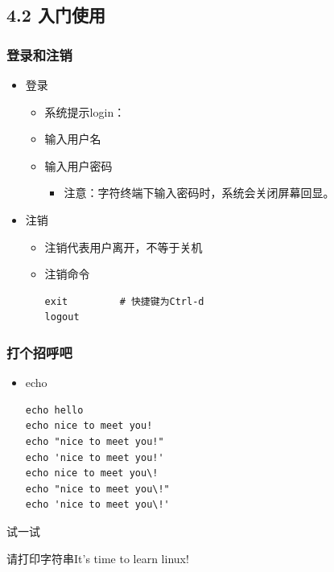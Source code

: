 \documentclass[xcolor=svgnames,bigger,presentation]{beamer}
\begin{document}
\subsection{4.2 入门使用}
\label{sec-4-2}
\begin{frame}[fragile]
\frametitle{登录和注销}
\label{sec-4-2-1}
\begin{itemize}

\item 登录
\label{sec-4-2-1-1}%
\begin{itemize}

\item 系统提示login：
\label{sec-4-2-1-1-1}%

\item 输入用户名
\label{sec-4-2-1-1-2}%

\item 输入用户密码
\label{sec-4-2-1-1-3}%
\begin{itemize}

\item 注意：字符终端下输入密码时，系统会关闭屏幕回显。
\label{sec-4-2-1-1-3-1}%
\end{itemize} %
\end{itemize} %

\item 注销
\label{sec-4-2-1-2}%
\begin{itemize}

\item 注销代表用户离开，不等于关机
\label{sec-4-2-1-2-1}%

\item 注销命令\\
\label{sec-4-2-1-2-2}%
\begin{verbatim}
exit         # 快捷键为Ctrl-d
logout
\end{verbatim}
\end{itemize} %
\end{itemize} %
\end{frame}
\begin{frame}[fragile]
\frametitle{打个招呼吧}
\label{sec-4-2-2}
\begin{itemize}

\item echo\\
\label{sec-4-2-2-1}%
\begin{verbatim}
echo hello
echo nice to meet you!
echo "nice to meet you!"
echo 'nice to meet you!'
echo nice to meet you\!
echo "nice to meet you\!"
echo 'nice to meet you\!'
\end{verbatim}
\end{itemize} %
\begin{block}{试一试}
\label{sec-4-2-2-2}

请打印字符串It's time to learn linux!
\end{block}
\end{frame}
\end{document}
